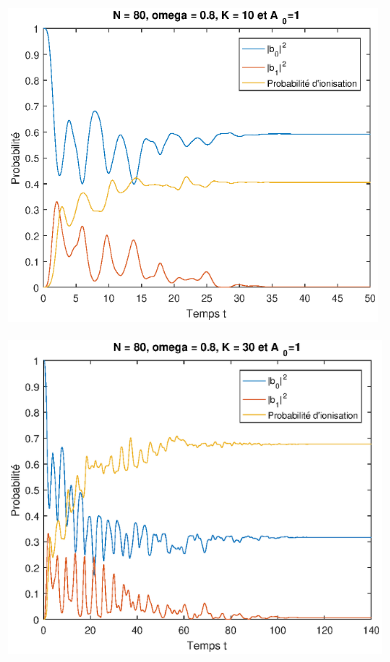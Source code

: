 \documentclass{report}
\begin{document}
\begin{figure}
\begin{center}
  \includegraphics[height=8.3cm]{N80_W08_K10_A1.eps}
      \end{center}
  \caption{}
  \label{fig_N80_W08_K10_A1}
\end{figure}

\begin{figure}
\begin{center}
  \includegraphics[height=8.3cm]{N80_W08_K30_A1.eps}
      \end{center}
  \caption{}
  \label{fig_N80_W08_K30_A1}
\end{figure}
\end{document}

